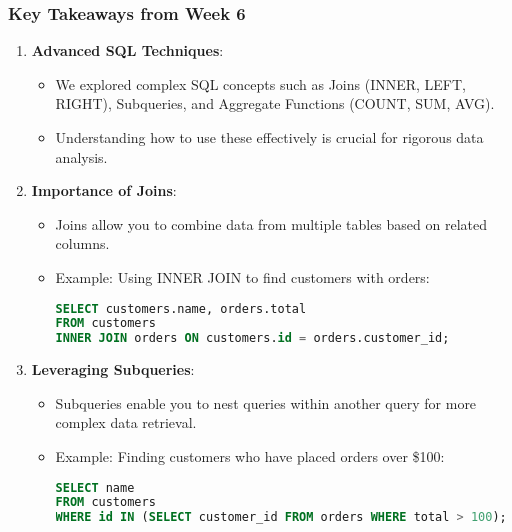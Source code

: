 \documentclass[aspectratio=169]{beamer}
\begin{document}
\begin{frame}[fragile]
    \frametitle{Key Takeaways from Week 6}
    \begin{enumerate}
        \item \textbf{Advanced SQL Techniques}: 
        \begin{itemize}
            \item We explored complex SQL concepts such as Joins (INNER, LEFT, RIGHT), Subqueries, and Aggregate Functions (COUNT, SUM, AVG).
            \item Understanding how to use these effectively is crucial for rigorous data analysis.
        \end{itemize}
        
        \item \textbf{Importance of Joins}:
        \begin{itemize}
            \item Joins allow you to combine data from multiple tables based on related columns.
            \item Example: Using INNER JOIN to find customers with orders:
            \begin{lstlisting}[language=SQL]
SELECT customers.name, orders.total
FROM customers
INNER JOIN orders ON customers.id = orders.customer_id;
            \end{lstlisting}
        \end{itemize}
        
        \item \textbf{Leveraging Subqueries}:
        \begin{itemize}
            \item Subqueries enable you to nest queries within another query for more complex data retrieval.
            \item Example: Finding customers who have placed orders over \$100:
            \begin{lstlisting}[language=SQL]
SELECT name 
FROM customers 
WHERE id IN (SELECT customer_id FROM orders WHERE total > 100);
            \end{lstlisting}
        \end{itemize}
    \end{enumerate}
\end{frame}
\end{document}
